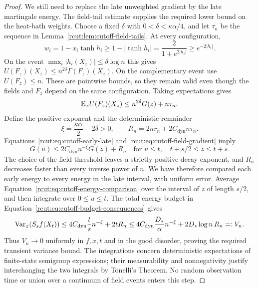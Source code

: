 \begin{proof}
We still need to replace the late unweighted gradient by the late
martingale energy.  The field-tail estimate supplies the required
lower bound on the heat-bath weights.  Choose a fixed $\delta$ with
$0<\delta<\kappa\alpha/4$, and let $\tau_n$ be the sequence in
Lemma~\ref{rcut:lem:cutoff-field-tails}.  At every configuration,
\[
 w_i=1-x_i\tanh h_i
 \ge 1-|\tanh h_i|
 =\frac{2}{1+e^{2|h_i|}}\ge e^{-2|h_i|}.
\]
On the event $\max_i|h_i(X_z)|\le\delta\log n$ this gives
$U(F_z)(X_z)\le n^{2\delta}\Gamma(F_z)(X_z)$.
On the complementary event use $U(F_z)\le n$.  These are pointwise
bounds, so they remain valid even though the fields and $F_z$ depend
on the same configuration.  Taking expectations gives
\begin{equation}
 \mathbb E_xU(F_z)(X_z)\le n^{2\delta}G(z)+n\tau_n.
 \label{rcut:eq:cutoff-field-gradient}
\end{equation}
Define the positive exponent and the deterministic remainder
\[
 \xi=\frac{\kappa\alpha}{2}-2\delta>0,
 \qquad R_n=2n r_n+2C_{\mathrm{dyn}}n\tau_n.
\]
Equations~\eqref{rcut:eq:cutoff-early-late} and
\eqref{rcut:eq:cutoff-field-gradient} imply
\begin{equation}
 G(u)\le 2C_{\mathrm{dyn}}n^{-\xi}G(z)+R_n
 \quad\text{for }u\le t,\quad t+s/2\le z\le t+s.
 \label{rcut:eq:cutoff-energy-comparison}
\end{equation}
The choice of the field threshold leaves a strictly positive decay
exponent, and $R_n$ decreases faster than every inverse power of $n$.
We have therefore compared each early energy to every energy in the
late interval, with uniform error.  Average
Equation~\eqref{rcut:eq:cutoff-energy-comparison} over the interval of
$z$ of length $s/2$, and then integrate over $0\le u\le t$.
The total energy budget in
Equation~\eqref{rcut:eq:cutoff-budget-consequences} gives
\begin{equation}
 \operatorname{Var}_x(S_sf(X_t))
 \le 4C_{\mathrm{dyn}}\frac{t}{s}n^{-\xi}+2tR_n
 \le 4C_{\mathrm{dyn}}\frac{D_*}{\alpha}n^{-\xi}
            +2D_*\log n\,R_n=:V_n.
 \label{rcut:eq:cutoff-late-variance}
\end{equation}
Thus $V_n\to0$ uniformly in $f,x,t$ and in the good disorder, proving
the required transient variance bound.  The integrations concern
deterministic expectations of finite-state semigroup expressions;
their measurability and nonnegativity justify interchanging the two
integrals by Tonelli's Theorem.  No random observation time or union
over a continuum of field events enters this step.


\end{proof}
